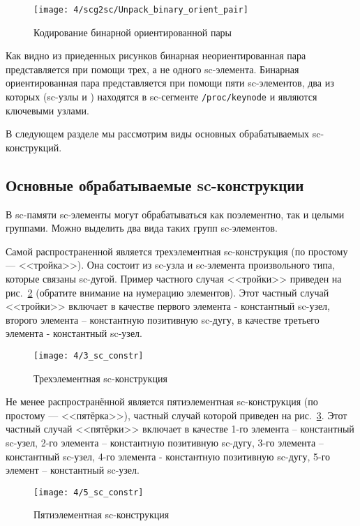\begin{figure}[h!]
  \centering
  \texttt{[image: 4/scg2sc/Unpack\_binary\_orient\_pair]}
  \caption{Кодирование бинарной ориентированной пары}
  \label{fig:Unpack_binary_orient_pair}
\end{figure}

Как видно из приеденных рисунков бинарная неориентированная пара
представляется при помощи трех, а не одного sc-элемента. Бинарная
ориентированная пара представляется при помощи пяти sc-элементов, два
из которых (sc-узлы  и ) находятся в sc-сегменте
\verb|/proc/keynode| и являются ключевыми узлами.

В следующем разделе мы рассмотрим виды основных обрабатываемых
sc-конструкций.

\clearpage

\subsection{Основные обрабатываемые sc-конструкции}
\label{sec:libsc_main_sc_constructs}

В sc-памяти sc-элементы могут обрабатываться как поэлементно, так и
целыми группами. Можно выделить два вида таких групп sc-элементов.

Самой распространенной является трехэлементная sc-конструкция (по
простому --- <<тройка>>). Она состоит из sc-узла и sc-элемента
произвольного типа, которые связаны sc-дугой. Пример частного случая
<<тройки>> приведен на рис.~\ref{fig:3_sc_constr} (обратите внимание
на нумерацию элементов). Этот частный случай <<тройки>> включает в
качестве первого элемента - константный sc-узел, второго элемента –
константную позитивную sc-дугу, в качестве третьего элемента -
константный sc-узел.

\begin{figure}[h!]
  \centering
  \texttt{[image: 4/3\_sc\_constr]}
  \caption{Трехэлементная sc-конструкция}
  \label{fig:3_sc_constr}
\end{figure}

Не менее распространённой является пятиэлементная sc-конструкция (по
простому --- <<пятёрка>>), частный случай которой приведен на
рис.~\ref{fig:5_sc_constr}. Этот частный случай <<пятёрки>> включает в
качестве 1-го элемента – константный sc-узел, 2-го элемента –
константную позитивную sc-дугу, 3-го элемента – константный sc-узел,
4-го элемента - константную позитивную sc-дугу, 5-го элемент –
константный sc-узел.

\begin{figure}[h!]
  \centering
  \texttt{[image: 4/5\_sc\_constr]}
  \caption{Пятиэлементная sc-конструкция}
  \label{fig:5_sc_constr}
\end{figure}

